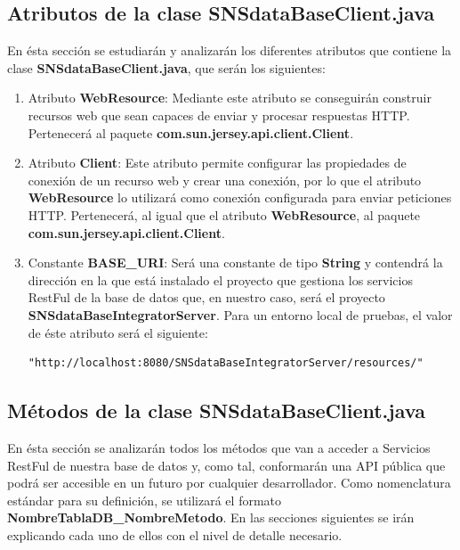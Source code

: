 \subsection{Atributos de la clase SNSdataBaseClient.java}
En ésta sección se estudiarán y analizarán los diferentes atributos que contiene la clase \textbf{SNSdataBaseClient.java}, que serán los siguientes:
\begin{enumerate}
\item Atributo \textbf{WebResource}: Mediante este atributo se conseguirán construir recursos web que sean capaces de enviar y procesar respuestas HTTP. Pertenecerá al paquete \textbf{com.sun.jersey.api.client.Client}.
\item Atributo \textbf{Client}: Este atributo permite configurar las propiedades de conexión de un recurso web y crear una conexión, por lo que el atributo \textbf{WebResource} lo utilizará como conexión configurada para enviar peticiones HTTP. Pertenecerá, al igual que el atributo \textbf{WebResource}, al paquete \textbf{com.sun.jersey.api.client.Client}.
\item Constante \textbf{BASE\_URI}: Será una constante de tipo \textbf{String} y contendrá la dirección en la que está instalado el proyecto que gestiona los servicios RestFul de la base de datos que, en nuestro caso, será el proyecto \textbf{SNSdataBaseIntegratorServer}. Para un entorno local de pruebas, el valor de éste atributo será el siguiente: \begin{verbatim}"http://localhost:8080/SNSdataBaseIntegratorServer/resources/"\end{verbatim}
\end{enumerate}

\subsection{Métodos de la clase SNSdataBaseClient.java}
En ésta sección se analizarán todos los métodos que van a acceder a Servicios RestFul de nuestra base de datos y, como tal, conformarán una API pública que podrá ser accesible en un futuro por cualquier desarrollador. Como nomenclatura estándar para su definición, se utilizará el formato \textbf{NombreTablaDB\_NombreMetodo}. En las secciones siguientes se irán explicando cada uno de ellos con el nivel de detalle necesario.

